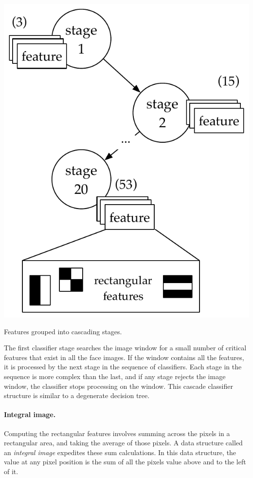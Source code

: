 \begin{marginfigure}
  \includegraphics[width=\textwidth]{nsp-figs/cascade_structure.pdf}
  \caption{Features grouped into cascading stages.}
  \label{fig:vj-cascade}
\end{marginfigure}


The first classifier stage searches the image window for a small number of critical features that exist in all the face images. If the window contains all the features, it is processed by the next stage in the sequence of classifiers. Each stage in the sequence is more complex than the last, and if any stage rejects the image window, the classifier stops processing on the window. This cascade classifier structure is similar to a degenerate decision tree.

\paragraph{Integral image.}Computing the rectangular features involves summing across
the pixels in a rectangular area, and taking the average of those pixels.
A data structure called an \emph{integral image} expedites these sum calculations. In this
data structure, the value at any pixel position is the sum of all the pixels value above and
to the left of it.

